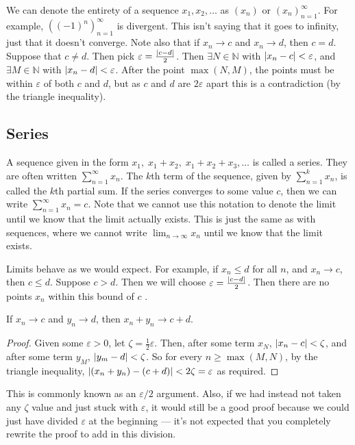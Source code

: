 We can denote the entirety of a sequence \(x_1, x_2, \dots\) as \((x_n)\) or \((x_n)_{n=1}^\infty\).
For example, \(\left( (-1)^n \right)_{n=1}^{\infty}\) is divergent.
This isn't saying that it goes to infinity, just that it doesn't converge.
Note also that if \(x_n \to c\) and \(x_n \to d\), then \(c=d\).
Suppose that \(c \neq d\).
Then pick \(\varepsilon = \frac{\abs{c-d}}{2}\).
Then \(\exists N \in \mathbb N\) with \(\abs{x_n - c} < \varepsilon\), and \(\exists M \in \mathbb N\) with \(\abs{x_n - d} < \varepsilon\).
After the point \(\max(N, M)\), the points must be within \(\varepsilon\) of both \(c\) and \(d\), but as \(c\) and \(d\) are \(2\varepsilon\) apart this is a contradiction (by the triangle inequality).

\subsection{Series}
A sequence given in the form \(x_1,\; x_1 + x_2,\; x_1 + x_2 + x_3, \dots\) is called a series.
They are often written \(\sum_{n=1}^\infty x_n\).
The \(k\)th term of the sequence, given by \(\sum_{n=1}^k x_n\), is called the \(k\)th partial sum.
If the series converges to some value \(c\), then we can write \(\sum_{n=1}^\infty x_n = c\).
Note that we cannot use this notation to denote the limit until we know that the limit actually exists.
This is just the same as with sequences, where we cannot write \(\lim_{n\to\infty} x_n\) until we know that the limit exists.

Limits behave as we would expect.
For example, if \(x_n \leq d\) for all \(n\), and \(x_n \to c\), then \(c \leq d\).
Suppose \(c > d\).
Then we will choose \(\varepsilon = \frac{\abs{c - d}}{2}\).
Then there are no points \(x_n\) within this bound of \(c\) \contradiction.

\begin{proposition}
	If \(x_n \to c\) and \(y_n \to d\), then \(x_n + y_n \to c + d\).
\end{proposition}
\begin{proof}
	Given some \(\varepsilon > 0\), let \(\zeta = \frac{1}{2}\varepsilon\).
	Then, after some term \(x_N\), \(\abs{x_n - c} < \zeta\), and after some term \(y_M\), \(\abs{y_m - d} < \zeta\).
	So for every \(n \geq \max(M, N)\), by the triangle inequality, \(\abs{(x_n + y_n) - (c + d)} < 2\zeta = \varepsilon\) as required.
\end{proof}
This is commonly known as an \(\varepsilon/2\) argument.
Also, if we had instead not taken any \(\zeta\) value and just stuck with \(\varepsilon\), it would still be a good proof because we could just have divided \(\varepsilon\) at the beginning --- it's not expected that you completely rewrite the proof to add in this division.

